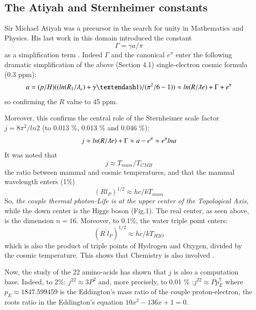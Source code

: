 \documentclass[twoside,draft]{article}
\begin{document}
\begin{sloppypar}
\subsection{The Atiyah and Sternheimer constants}
    Sir Michael Atiyah was a precursor in the search for unity in Mathematics and Physics. His last work in this domain introduced the constant $$\Gamma = \gamma a /\pi$$ as a simplification term \cite{Atiyah1}. Indeed $\Gamma$ and the canonical $e^{\pi}$ enter the following dramatic simplification of the above (Section 4.1) single-electron cosmic formula (0.3 ppm):    
\begin{equation}
a = (p/H)((ln(R_1/\lambdabar_e) + \gamma – 1)/(\pi^2/6 - 1)) \approx ln(R/\lambdabar e) + \Gamma + e^{\pi}
\end{equation}
so confirming the $R$ value to 45 ppm.

Moreover, this confirms the central role of the Sternheimer scale factor $j = 8\pi^2/ln2$ (to 0.013 \%, 0.013 \% and 0.046 \%):
\begin{equation}
j \approx ln(R/\lambdabar e) + \Gamma \approx a - e^{\pi} \approx e^{\pi} lna
\end{equation}
It was noted \cite{Sanchez1} that $$j\approx T_{mam}/T_{CMB}$$ the ratio between mammal and cosmic temperatures, and that the mammal wavelength enters (1\%) $$(Rl_P)^{1/2}\approx hc/kT_{mam}$$ So, \textit{the couple thermal photon-Life is at the upper center of the Topological Axis}, while the down center is the Higgs boson (Fig.1). The real center, as seen above, is the dimension $n = 16$. Moreover, to 0.1\%, the water triple point enters: $$(R^{\prime}l_P)^{1/2}\approx hc/kT_{H2O}$$ which is also the product of triple points of Hydrogen and Oxygen, divided by the cosmic temperature. This shows that Chemistry is also involved \cite{Sanchez1}.

Now, the study of the 22 amino-acids \cite{Sanchez1} has shown that $j$ is also a computation base. Indeed, to 2\%: $j^{22} \approx 3 P^2 $ and, more precisely, to 0.01 \% :$j^{22} \approx Pp_E^7 $ where $ p_E \approx 1847.599459$ is the Eddington's mass ratio of the couple proton-electron, the roots ratio in the Eddington's equation $10x^2 - 136x + 1 = 0 $.


\end{sloppypar}
\end{document}
